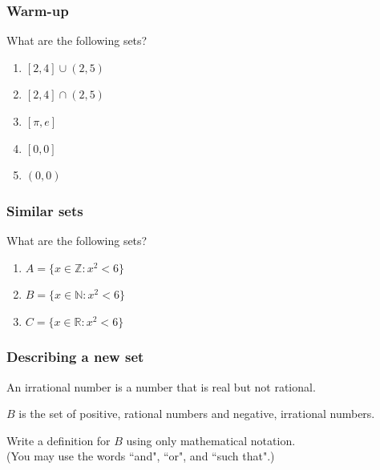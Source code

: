 \begin{frame}
	\frametitle{Warm-up}

	What are the following sets?

	\begin{enumerate}
		\item $[2,4] \cup (2,5)$

		\item $[2,4] \cap (2,5)$

		\item $[\pi,e]$

		\item $[0,0]$

		\item $(0,0)$
	\end{enumerate}
\end{frame}

\begin{frame}
	\frametitle{Similar sets}

	What are the following sets?

	\begin{enumerate}
		\item $\displaystyle A = \{ x \in \mathbb{Z}: x^{2}< 6\}$

		\item $\displaystyle B = \{ x \in \mathbb{N}: x^{2}< 6\}$

		\item $\displaystyle C = \{ x \in \mathbb{R}: x^{2}< 6\}$
	\end{enumerate}
\end{frame}

\begin{frame}
	\frametitle{Describing a new set}

	An irrational number is a number that is real but not rational.

	$B$ is the set of positive, rational numbers and negative, irrational numbers.

	Write a definition for $B$ using only mathematical notation. \\ (You may use
	the words ``and", ``or", and ``such that".)
\end{frame}

